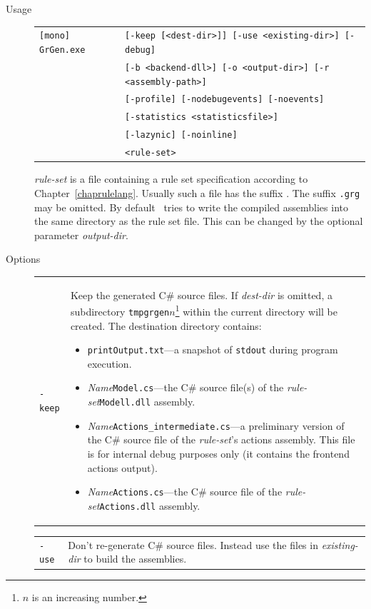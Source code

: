 \begin{description}
  \item[Usage] \begin{tabular*}{\linewidth}{@{}l@{}l}\texttt{[mono] GrGen.exe } & \texttt{[-keep [<dest-dir>]] [-use <existing-dir>] [-debug]}\\
        &\texttt{[-b <backend-dll>] [-o <output-dir>] [-r <assembly-path>]}\\
        &\texttt{[-profile] [-nodebugevents] [-noevents]}\\
        &\texttt{[-statistics <statisticsfile>]}\\
        &\texttt{[-lazynic] [-noinline]}\\
        &\texttt{<rule-set>}\end{tabular*}
    \emph{rule-set} is a file containing a rule set specification according to Chapter~\ref{chaprulelang}. Usually such a file has the suffix \texttt{}. The suffix \texttt{.grg} may be omitted.
By default \GrG\ tries to write the compiled assemblies into the same directory as the rule set file. This can be changed by the optional parameter \emph{output-dir}.
  \item[Options] \mbox{}
    \begin{tabularx}{\linewidth}{lX}
      \texttt{-keep} & Keep the generated C\# source files. If \emph{dest-dir} is omitted, a subdirectory \texttt{tmpgrgen$n$}\footnote{$n$ is an increasing number.} within the current directory will be created. The destination directory contains:
\begin{itemize}
  \item \texttt{printOutput.txt}---a snapshot of \texttt{stdout} during program execution.
  \item \emph{Name}\texttt{Model.cs}---the C\# source file(s) of the \emph{rule-set}\texttt{Modell.dll} assembly.
  \item \emph{Name}\texttt{Actions\_intermediate.cs}---a preliminary version of the C\# source file of the \emph{rule-set}'s actions assembly.
	This file is for internal debug purposes only (it contains the frontend actions output).
  \item \emph{Name}\texttt{Actions.cs}---the C\# source file of the \emph{rule-set}\texttt{Actions.dll} assembly.
\end{itemize}\\
\end{tabularx}
\begin{tabularx}{\linewidth}{lX}
      \texttt{-use} & Don't re-generate C\# source files. Instead use the files in \emph{existing-dir} to build the assemblies.\\

\end{tabularx}
\end{description}
